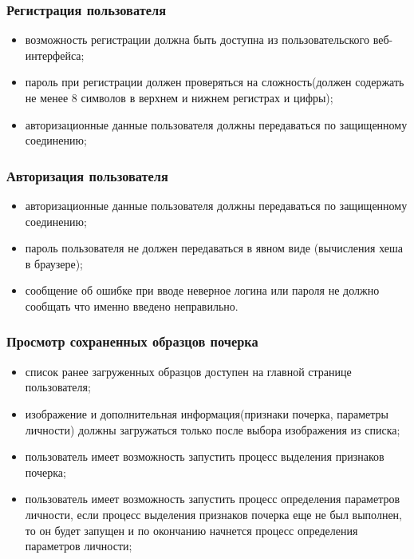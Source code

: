 \subsubsection{Регистрация пользователя}
\label{sec:freq:reg}
\begin{itemize}
	\item возможность регистрации должна быть доступна из пользовательского веб-интерфейса;
	\item пароль при регистрации должен проверяться на сложность(должен содержать не менее 8 символов в верхнем и нижнем регистрах и цифры);
	\item авторизационные данные пользователя должны передаваться по защищенному соединению;
\end{itemize}

\subsubsection{Авторизация пользователя}
\label{sec:freq:auth}
\begin{itemize}
	\item авторизационные данные пользователя должны передаваться по защищенному соединению;
	\item пароль пользователя не должен передаваться в явном виде (вычисления хеша в браузере);
 	\item сообщение об ошибке при вводе неверное логина или пароля не должно сообщать что именно введено неправильно.
\end{itemize}

\subsubsection{Просмотр сохраненных образцов почерка}
\label{sec:freq:show}
\begin{itemize}
	\item список ранее загруженных образцов доступен на главной странице пользователя;
	\item изображение и дополнительная информация(признаки почерка, параметры личности) должны загружаться только после выбора изображения из списка;
	\item пользователь имеет возможность запустить процесс выделения признаков почерка;
	\item пользователь имеет возможность запустить процесс определения параметров личности, если процесс выделения признаков почерка еще не был выполнен, то он будет запущен и по окончанию начнется процесс определения параметров личности;
\end{itemize}

